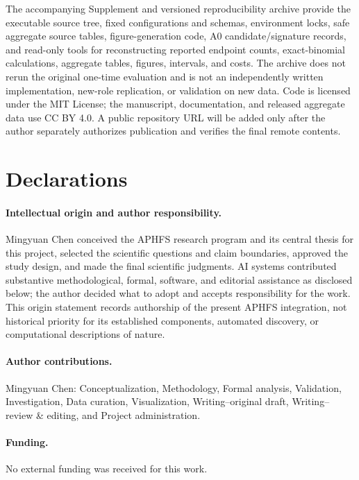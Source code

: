 \documentclass[10pt]{article}
\theoremstyle{definition}
\begin{document}
The accompanying Supplement and versioned reproducibility archive provide the executable source
tree, fixed configurations and schemas, environment locks, safe aggregate source tables,
figure-generation code, A0 candidate/signature records, and read-only tools for reconstructing
reported endpoint counts, exact-binomial calculations, aggregate tables, figures, intervals, and
costs. The archive does not rerun the original one-time evaluation and is not an independently
written implementation, new-role replication, or validation on new data. Code is licensed under
the MIT License; the manuscript, documentation, and released aggregate data use CC BY 4.0. A
public repository URL will be added only after the author separately authorizes publication and
verifies the final remote contents.

\section{Declarations}

\paragraph{Intellectual origin and author responsibility.}
Mingyuan Chen conceived the APHFS research program and its central thesis for this project,
selected the scientific questions and claim boundaries, approved the study design, and made the
final scientific judgments. AI systems contributed substantive methodological, formal, software,
and editorial assistance as disclosed below; the author decided what to adopt and accepts
responsibility for the work. This origin statement records authorship of the present APHFS
integration, not historical priority for its established components, automated discovery, or
computational descriptions of nature.

\paragraph{Author contributions.}
Mingyuan Chen: Conceptualization, Methodology, Formal analysis, Validation,
Investigation, Data curation, Visualization, Writing--original draft, Writing--review \& editing,
and Project administration.

\paragraph{Funding.}
No external funding was received for this work.
\end{document}
